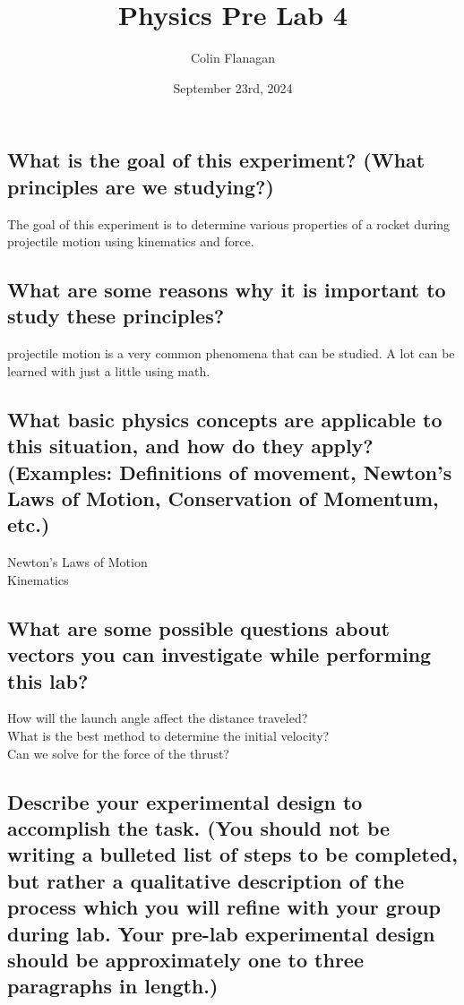 \documentclass{article}
\title{Physics Pre Lab 4}
\author{Colin Flanagan}
\date{September 23rd, 2024}
\begin{document}
\maketitle

\subsection*{What is the goal of this experiment? (What principles are we studying?)}

    The goal of this experiment is to determine various properties of a rocket during projectile motion using kinematics and force.
    

\subsection*{What are some reasons why it is important to study these principles?
}

    projectile motion is a very common phenomena that can be studied. A lot can be learned with just a little using math.
    
\subsection*{What basic physics concepts are applicable to this situation, and how do they apply? (Examples: Definitions of movement, Newton’s Laws of Motion, Conservation of Momentum, etc.)}

    Newton's Laws of Motion\\
    Kinematics

\subsection*{What are some possible questions about vectors you can investigate while performing this lab?
}

   How will the launch angle affect the distance traveled? \\
   
   What is the best method to determine the initial velocity?\\

   Can we solve for the force of the thrust?\\

\subsection*{Describe your experimental design to accomplish the task. (You should not be writing a bulleted list of steps to be completed, but rather a qualitative description of the process which you will refine with your group during lab. Your pre-lab experimental design should be approximately one to three paragraphs in length.)}
\end{document}
